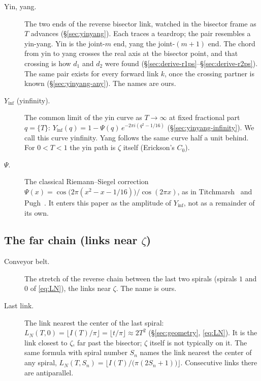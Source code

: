 \documentclass[11pt]{article}
\theoremstyle{definition}
\begin{document}
\begin{description}
\item[Yin, yang.]
The two ends of the reverse bisector link, watched in the
bisector frame as $T$ advances
(\S\ref{sec:yinyang}).
Each traces a teardrop; the pair resembles a yin-yang.
Yin is the joint-$m$ end, yang the joint-$(m+1)$ end.
The chord from yin to yang crosses the real axis at the bisector
point, and that crossing is how $d_1$ and $d_2$ were found
(\S\ref{sec:derive-r1ps}--\S\ref{sec:derive-r2ps}).
The same pair exists for every forward link $k$, once the crossing
partner is known (\S\ref{sec:yinyang-any}).
The names are ours.

\item[$Y_{\inf}$ (yinfinity).]
The common limit of the yin curve as $T\to\infty$ at fixed
fractional part $q=\{T\}$:
$Y_{\inf}(q)=1-\Psi(q)\,e^{-2\pi i(q^{2}-1/16)}$
(\S\ref{sec:yinyang-infinity}).
We call this curve yinfinity.
Yang follows the same curve half a unit behind.
For $0<T<1$ the yin path is $\zeta$ itself (Erickson's $C_0$).

\item[$\Psi$.]
The classical Riemann--Siegel correction
$\Psi(x)=\cos\bigl(2\pi(x^{2}-x-1/16)\bigr)/\cos(2\pi x)$,
as in Titchmarsh~\cite[\S15.3]{Titchmarsh1986} and
Pugh~\cite[\S5.4.1]{Pugh1998}.
It enters this paper as the amplitude of $Y_{\inf}$, not as a
remainder of its own.

\end{description}

\subsection*{The far chain (links near $\zeta$)}

\begin{description}
\item[Conveyor belt.]
The stretch of the reverse chain between the last two spirals
(spirals $1$ and $0$ of \eqref{eq:LN}), the links near $\zeta$.
The name is ours.

\item[Last link.]
The link nearest the center of the last spiral:
$L_N(T,0)=\lfloor I(T)/\pi\rfloor=\lfloor t/\pi\rfloor\approx 2T^{2}$
(\S\ref{sec:geometry}, \eqref{eq:LN}).
It is the link closest to $\zeta$, far past the bisector; $\zeta$
itself is not typically on it.
The same formula with spiral number $S_n$ names the link nearest the
center of any spiral,
$L_N(T,S_n)=\bigl\lfloor I(T)/\bigl(\pi(2S_n+1)\bigr)\bigr\rfloor$.
Consecutive links there are antiparallel.
\end{description}
\end{document}
